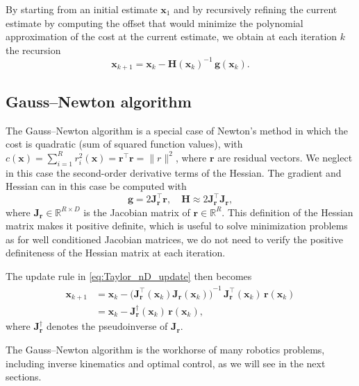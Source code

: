 \documentclass[10pt,a4paper]{article} %
\newcommand{\trsp}{{\scriptscriptstyle\top}}
\newcommand{\psin}{{\dagger}}
\begin{document}
By starting from an initial estimate $\bm{x}_1$ and by recursively refining the current estimate by computing the offset that would minimize the polynomial approximation of the cost at the current estimate, we obtain at each iteration $k$ the recursion
\begin{equation}
	\bm{x}_{k+1} = \bm{x}_k - {\bm{H}(\bm{x}_k)}^{-1} \, \bm{g}(\bm{x}_k).
	\label{eq:Taylor_nD_update}
\end{equation}


\subsection{Gauss--Newton algorithm}\label{sec:GaussNewton}

The Gauss--Newton algorithm is a special case of Newton's method in which the cost is quadratic (sum of squared function values), with $c(\bm{x})=\sum_{i=1}^R r_i^2(\bm{x})=\bm{r}^\trsp\bm{r}=\|r\|^2$, where $\bm{r}$ are residual vectors. We neglect in this case the second-order derivative terms of the Hessian. The gradient and Hessian can in this case be computed with 
\begin{equation*}
	\bm{g} = 2 \bm{J}_{\bm{r}}^\trsp \bm{r} ,\quad 
	\bm{H} \approx 2 \bm{J}_{\bm{r}}^\trsp \bm{J}_{\bm{r}},
\end{equation*}
where $\bm{J}_{\bm{r}}\in\mathbb{R}^{R\times D}$ is the Jacobian matrix of $\bm{r}\in\mathbb{R}^R$. This definition of the Hessian matrix makes it positive definite, which is useful to solve minimization problems as for well conditioned Jacobian matrices, we do not need to verify the positive definiteness of the Hessian matrix at each iteration.

The update rule in \eqref{eq:Taylor_nD_update} then becomes
\begin{align}
	\bm{x}_{k+1} &= \bm{x}_k - {\big(\bm{J}_{\bm{r}}^\trsp(\bm{x}_k) \bm{J}_{\bm{r}}(\bm{x}_k)\big)}^{-1} \, 
	\bm{J}_{\bm{r}}^\trsp(\bm{x}_k) \, \bm{r}(\bm{x}_k) \\
	&= \bm{x}_k - \bm{J}_{\bm{r}}^\psin(\bm{x}_k) \, \bm{r}(\bm{x}_k),
	\label{eq:GaussNewtonUpdate}
\end{align}
where $\bm{J}_{\bm{r}}^\psin$ denotes the pseudoinverse of $\bm{J}_{\bm{r}}$.

The Gauss--Newton algorithm is the workhorse of many robotics problems, including inverse kinematics and optimal control, as we will see in the next sections.
\end{document}
